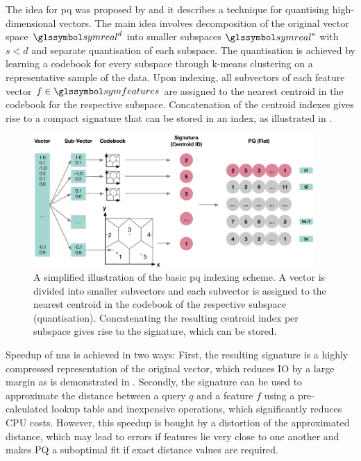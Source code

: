 The idea for \acrshort{pq} was proposed by \cite{Jegou:2010Product} and it describes a technique for quantising high-dimensional vectors. The main idea involves decomposition of the original vector space $\symreal^d$ into smaller subspaces $\symreal^s$ with $s < d$ and separate quantisation of each subspace. The quantisation is achieved by learning a codebook for every subspace through k-means clustering on a representative sample of the data. Upon indexing, all subvectors of each feature vector $f \in \symfeatures$ are assigned to the nearest centroid in the codebook for the respective subspace. Concatenation of the centroid indexes gives rise to a compact signature that can be stored in an index, as illustrated in .

\begin{figure}[tb]
    \centering
    \includegraphics[width=0.95\textwidth]{figures/pq}
    \caption{A simplified illustration of the basic \acrshort{pq} indexing scheme. A vector is divided into smaller subvectors and each subvector is assigned to the nearest centroid in the codebook of the respective subspace (quantisation). Concatenating the resulting centroid index per subspace gives rise to the signature, which can be stored.}
    \label{fig:pq}
\end{figure}

Speedup of \acrshort{nns} is achieved in two ways: First, the resulting signature is a highly compressed representation of the original vector, which reduces IO by a large margin as is demonstrated in . Secondly, the signature can be used to approximate the distance between a query $q$ and a feature $f$ using a pre-calculated lookup table and inexpensive operations, which significantly reduces CPU costs. However, this speedup is bought by a distortion of the approximated distance, which may lead to errors if features lie very close to one another and makes PQ a suboptimal fit if exact distance values are required.

